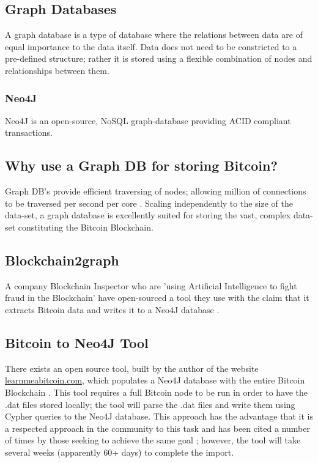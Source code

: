 \subsection{Graph Databases}
A graph database is a type of database where the relations between data are of equal importance to the data itself. Data does not need to be constricted to a pre-defined structure; rather it is stored using a flexible combination of nodes and relationships between them. 

\subsubsection{Neo4J}
Neo4J is an open-source, NoSQL graph-database providing ACID compliant transactions.

\subsection{Why use a Graph DB for storing Bitcoin?}
Graph DB's provide efficient traversing of nodes; allowing million of connections to be traversed per second per core \cite{RefWorks:doc:5c98f0c6e4b00cbb4da393d8}. Scaling independently to the size of the data-set, a graph database is excellently suited for storing the vast, complex data-set constituting the Bitcoin Blockchain. 


\subsection{Blockchain2graph}
A company Blockchain Inspector who are 'using Artificial Intelligence to fight fraud in the Blockchain' have open-sourced a tool they use with the claim that it extracts Bitcoin data and writes it to a Neo4J database . 

\subsection{Bitcoin to Neo4J Tool}
There exists an open source tool, built by the author of the website \url{learnmeabitcoin.com}, which populates a Neo4J database with the entire Bitcoin Blockchain \cite{RefWorks:doc:5c98e031e4b068320632cef2}. This tool requires a full Bitcoin node to be run in order to have the .dat files stored locally; the tool will parse the .dat files and write them using Cypher queries to the Neo4J database. This approach has the advantage that it is a respected approach in the community to this task and has been cited a number of times by those seeking to achieve the same goal \cite{RefWorks:doc:5c98e0cde4b044512c0b8641}; however, the tool will take several weeks (apparently 60+ days) to complete the import. 

